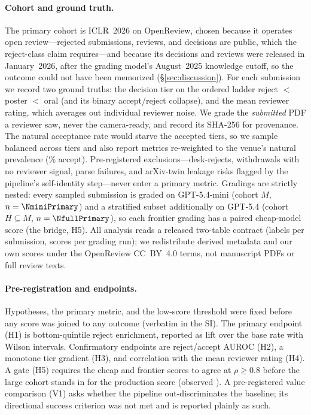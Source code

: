 \paragraph{Cohort and ground truth.}
\label{sec:data}%
The primary cohort is ICLR~2026 on OpenReview, chosen because it operates open review---rejected
submissions, reviews, and decisions are public, which the reject-class claim requires---and because
its decisions and reviews were released in January~2026, after the grading model's August~2025
knowledge cutoff, so the outcome could not have been memorized (\S\ref{sec:discussion}). For each
submission we record two ground truths: the decision tier on the ordered ladder reject $<$ poster
$<$ oral (and its binary accept/reject collapse), and the mean reviewer rating, which averages out
individual reviewer noise. We grade the \emph{submitted} PDF a reviewer saw, never the
camera-ready, and record its SHA-256 for provenance. The natural acceptance rate would starve the
accepted tiers, so we sample balanced across tiers and also report metrics re-weighted to the
venue's natural prevalence (\natAcceptRate\% accept). Pre-registered exclusions---desk-rejects,
withdrawals with no reviewer signal, parse failures, and arXiv-twin leakage risks flagged by the
pipeline's self-identity step---never enter a primary metric. Gradings are strictly nested: every
sampled submission is graded on GPT-5.4-mini (cohort $M$, $n=\NminiPrimary$) and a stratified
subset additionally on GPT-5.4 (cohort $H\subseteq M$, $n=\NfullPrimary$), so each frontier
grading has a paired cheap-model score (the bridge, H5). All analysis reads a released two-table
contract (labels per submission, scores per grading run); we redistribute derived metadata and our
own scores under the OpenReview CC~BY~4.0 terms, not manuscript PDFs or full review texts.

\paragraph{Pre-registration and endpoints.}
Hypotheses, the primary metric, and the low-score threshold were fixed before any score was joined
to any outcome (verbatim in the SI). The primary endpoint (H1) is bottom-quintile reject
enrichment, reported as lift over the base rate with Wilson intervals. Confirmatory endpoints are
reject/accept AUROC (H2), a monotone tier gradient (H3), and correlation with the mean reviewer
rating (H4). A gate (H5) requires the cheap and frontier scores to agree at $\rho\ge0.8$ before the
large cohort stands in for the production score (observed \bridgeRhoFull). A pre-registered value
comparison (V1) asks whether the pipeline out-discriminates the baseline; its directional success
criterion was not met and is reported plainly as such.

